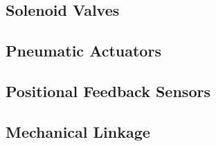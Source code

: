 \subsection{Solenoid Valves}


\subsection{Pneumatic Actuators}


\subsection{Positional Feedback Sensors}


\subsection{Mechanical Linkage}
